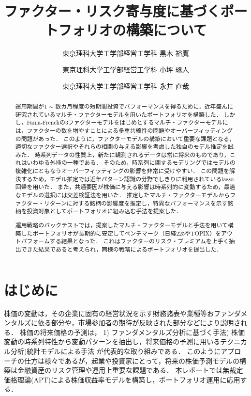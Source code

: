 \documentclass[11pt]{jreport}
\begin{document}
\title{ファクター・リスク寄与度に基づくポートフォリオの構築について\\}
\author{東京理科大学工学部経営工学科 \quad 黒木 裕鷹 \and 東京理科大学工学部経営工学科 \quad 小坪 琢人 \and 東京理科大学工学部経営工学科 \quad 永井 直哉}
\maketitle
\begin{abstract}

運用期間が1 $\sim$ 数カ月程度の短期間投資でパフォーマンスを得るために，近年盛んに研究されているマルチ・ファクターモデルを用いたポートフォリオを構築した．
しかし，Fama-Frenchの3ファクターモデルをはじめとするマルチ・ファクターモデルには，ファクターの数を増やすことによる多重共線性の問題やオーバーフィッティングの問題があった．
このように，ファクターモデルの構築において重要な課題となる，適切なファクター選択やそれらの相関の与える影響を考慮した独自のモデル推定を試みた．
時系列データの性質上，新たに観測されるデータは常に将来のものであり，これはいわゆる外挿の一種である．
そのため，時系列に関するモデリングではモデルの複雑化にともなうオーバーフィッティングの影響を非常に受けやすい．
この問題を解決するため，モデル推定では近年パターン認識の分野でしきりに利用されているlasso回帰を用いた．
また，共通要因が株価に与える影響は時系列的に変動するため，最適なモデルの選択には交差検証法を用いた．
推定したマルチ・ファクターモデルからファクター・リターンに対する銘柄の影響度を推定し，特異なパフォーマンスを示す銘柄を投資対象としてポートフォリオに組み込む手法を提案した．

運用戦略のバックテストでは，提案したマルチ・ファクターモデルと手法を用いて構築したポートフォリオが長期的に安定してベンチマーク（日経225やTOPIX）をアウトパフォームする結果となった． 
これはファクターのリスク・プレミアムを上手く抽出できた結果であると考えられ，同様の戦略によるポートフォリオを提出した．
\end{abstract}










\chapter{はじめに}
株価の変動は，その企業に固有の経営状況を示す財務諸表や業種等おファンダメンタルズに依る部分や，市場参加者の期待が反映された部分などにより説明される．
株価の将来価格の予測は，
1) ファンダメンタルズ分析に基づく手法) 株価変動の時系列特性から変動パターンを抽出し，将来価格の予測に用いるテクニカル分析)統計モデルによる手法\quad
が代表的な取り組みである．
このようにアプローチの仕方は様々であるが，起業や投資家にとって，将来の株価予測モデルの構築は金融資産のリスク管理や運用上重要な課題である．
本レポートでは無裁定価格理論(APT)による株価収益率モデルを構築し，ポートフォリオ運用に応用する．
\end{document}
